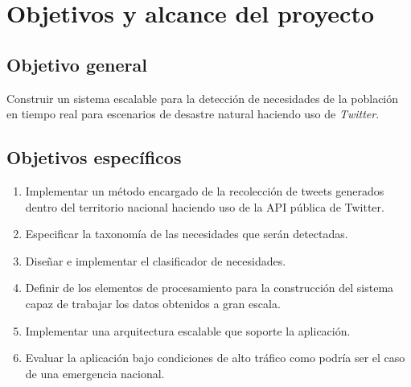 \section{Objetivos y alcance del proyecto}
\label{intro:objetivos}

\subsection{Objetivo general}
	Construir un sistema escalable para la detección de necesidades de la población en tiempo real para escenarios de desastre natural haciendo uso de \textit{Twitter}.

\subsection{Objetivos espec\'ificos}
\begin{enumerate}
\item	Implementar un método encargado de la recolección de tweets generados dentro del territorio nacional haciendo uso de la API pública de Twitter.
\item	Especificar la taxonomía de las necesidades que serán detectadas.
\item	Diseñar e implementar el clasificador de necesidades.
\item	Definir de los elementos de procesamiento para la construcción del sistema capaz de trabajar los datos obtenidos a gran escala.
\item	Implementar una arquitectura escalable que soporte la aplicación.
\item	Evaluar la aplicación bajo condiciones de alto tráfico como podría ser el caso de una emergencia nacional.
\end{enumerate}


